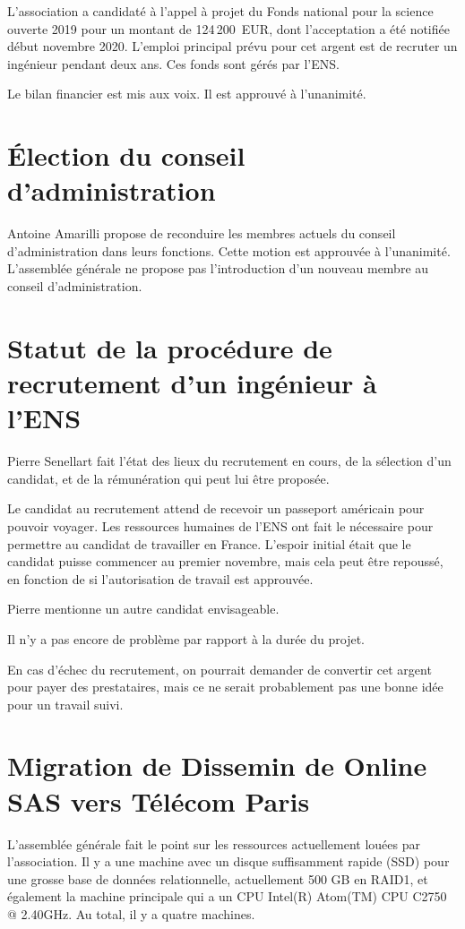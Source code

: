 \documentclass[a4paper]{article}
\begin{document}
L'association a candidaté à l'appel à projet du Fonds national pour la science
ouverte 2019 pour un montant de 124\,200~EUR, dont l'acceptation a été notifiée
début novembre 2020. L'emploi principal prévu pour cet argent est de recruter un
ingénieur pendant deux ans. Ces fonds sont gérés par l'ENS.

Le bilan financier est mis aux voix. Il est approuvé à l'unanimité.

\section{Élection du conseil d'administration}

Antoine Amarilli propose de reconduire les membres actuels du conseil d'administration dans leurs fonctions. Cette motion est approuvée à l'unanimité. L'assemblée générale ne propose pas l'introduction d'un nouveau membre au conseil d'administration.

\section{Statut de la procédure de recrutement d'un ingénieur à l'ENS}

Pierre Senellart fait l'état des lieux du recrutement en cours, de la sélection d'un candidat, et de la rémunération qui peut lui être proposée.

Le candidat au recrutement attend de recevoir un passeport américain pour pouvoir voyager. Les ressources humaines de l'ENS ont fait le nécessaire pour permettre au candidat de travailler en France. L'espoir initial était que le candidat puisse commencer au premier novembre, mais cela peut être repoussé, en fonction de si l'autorisation de travail est approuvée.

Pierre mentionne un autre candidat envisageable.

Il n'y a pas encore de problème par rapport à la durée du projet.

En cas d'échec du recrutement, on pourrait demander de convertir cet argent pour payer des prestataires, mais ce ne serait probablement pas une bonne idée pour un travail suivi.

\section{Migration de Dissemin de Online SAS vers Télécom Paris}

L'assemblée générale fait le point sur les ressources actuellement louées par
l'association.
Il y a une machine avec un disque suffisamment rapide (SSD) pour une grosse base
de données relationnelle, actuellement 500 GB en RAID1, et également la machine
principale qui a un CPU Intel(R) Atom(TM) CPU  C2750  @ 2.40GHz. Au total, il y
a quatre machines.
\end{document}
